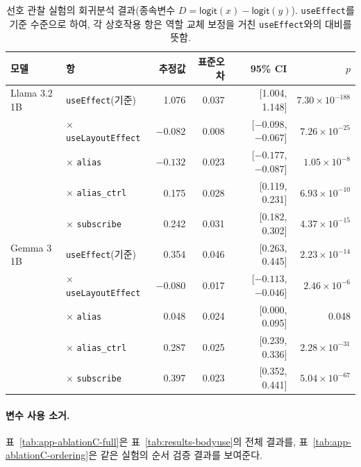 \begin{table}[t]
  \centering
  \small
  \begin{supertabular}{llrrrr}
    \toprule
    \textbf{모델} & \textbf{항} & \textbf{추정값} & \textbf{표준오차} & \textbf{95\% CI} & \textbf{$p$} \\
    \midrule
    Llama 3.2 1B & \texttt{useEffect}(기준) & 1.076 & 0.037 & [1.004, 1.148] & $7.30\times10^{-188}$ \\
    & $\times$ \texttt{useLayoutEffect} & $-0.082$ & 0.008 & [$-0.098$, $-0.067$] & $7.26\times10^{-25}$ \\
    & $\times$ \texttt{alias} & $-0.132$ & 0.023 & [$-0.177$, $-0.087$] & $1.05\times10^{-8}$ \\
    & $\times$ \texttt{alias\_ctrl} & 0.175 & 0.028 & [0.119, 0.231] & $6.93\times10^{-10}$ \\
    & $\times$ \texttt{subscribe} & 0.242 & 0.031 & [0.182, 0.302] & $4.37\times10^{-15}$ \\
    \midrule
    Gemma 3 1B & \texttt{useEffect}(기준) & 0.354 & 0.046 & [0.263, 0.445] & $2.23\times10^{-14}$ \\
    & $\times$ \texttt{useLayoutEffect} & $-0.080$ & 0.017 & [$-0.113$, $-0.046$] & $2.46\times10^{-6}$ \\
    & $\times$ \texttt{alias} & 0.048 & 0.024 & [0.000, 0.095] & 0.048 \\
    & $\times$ \texttt{alias\_ctrl} & 0.287 & 0.025 & [0.239, 0.336] & $2.28\times10^{-31}$ \\
    & $\times$ \texttt{subscribe} & 0.397 & 0.023 & [0.352, 0.441] & $5.04\times10^{-67}$ \\
    \bottomrule
  \end{supertabular}
  \caption{선호 관찰 실험의 회귀분석 결과(종속변수 $D=\textsf{logit}(x)-\textsf{logit}(y)$). \texttt{useEffect}를 기준 수준으로 하여, 각 상호작용 항은 역할 교체 보정을 거친 \texttt{useEffect}와의 대비를 뜻함.}
  \label{tab:app-gen-regression}
\end{table}

\paragraph{변수 사용 소거.}
표~\ref{tab:app-ablationC-full}은 표~\ref{tab:results-bodyuse}의 전체 결과를, 표~\ref{tab:app-ablationC-ordering}은 같은 실험의 순서 검증 결과를 보여준다.

